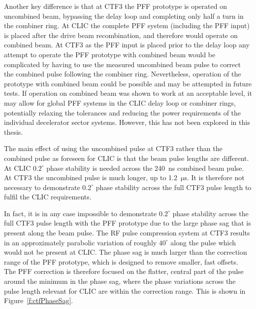 Another key difference is that at CTF3 the PFF prototype is operated on uncombined beam, bypassing the delay loop and completing only half a turn in the combiner ring. At CLIC the complete PFF system (including the PFF input) is placed after the drive beam recombination, and therefore would operate on combined beam. At CTF3 as the PFF input is placed prior to the delay loop any attempt to operate the PFF prototype with combined beam would be complicated by having to use the measured uncombined beam pulse to correct the combined pulse following the combiner ring. Nevertheless, operation of the prototype with combined beam could be possible and may be attempted in future tests. If operation on combined beam was shown to work at an acceptable level, it may allow for global PFF systems in the CLIC delay loop or combiner rings, potentially relaxing the tolerances and reducing the power requirements of the individual decelerator sector systems. However, this has not been explored in this thesis.

The main effect of using the uncombined pulse at CTF3 rather than the combined pulse as foreseen for CLIC is that the beam pulse lengths are different. At CLIC \(0.2^\circ\) phase stability is needed across the 240~ns combined beam pulse. At CTF3 the uncombined pulse is much longer, up to 1.2~\(\mathrm{\mu s}\). It is therefore not necessary to demonstrate \(0.2^\circ\) phase stability across the full CTF3 pulse length to fulfil the CLIC requirements.

In fact, it is in any case impossible to demonstrate \(0.2^\circ\) phase stability across the full CTF3 pulse length with the PFF prototype due to the large phase sag that is present along the beam pulse. The RF pulse compression system at CTF3 \cite{rfCompress} results in an approximately parabolic variation of roughly \(40^\circ\) along the pulse which would not be present at CLIC. The phase sag is much larger than the correction range of the PFF prototype, which is designed to remove smaller, fast offsets. The PFF correction is therefore focused on the flatter, central part of the pulse around the minimum in the phase sag, where the phase variations across the pulse length relevant for CLIC are within the correction range. This is shown in Figure~\ref{f:ctfPhaseSag}.

